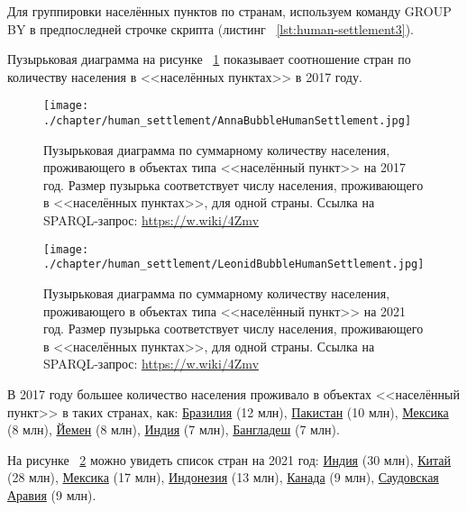 Для группировки населённых пунктов по странам, используем команду GROUP BY в предпоследней строчке скрипта (листинг ~\protect\ref{lst:human-settlement3}).

Пузырьковая диаграмма на рисунке ~\ref{fig:human-settlement-1} показывает соотношение стран по количеству населения в <<населённых пунктах>> в 2017 году.

\begin{figure}
\centering
	\texttt{[image: ./chapter/human\_settlement/AnnaBubbleHumanSettlement.jpg]}
	\label{fig:human-settlement-1}
    \caption[Пузырьковая диаграмма  по суммарному количеству населения в населённых пунктах, 2017.]{Пузырьковая диаграмма  по суммарному количеству населения, проживающего в объектах типа <<населённый пункт>> на 2017 год. Размер пузырька соответствует числу населения, проживающего в <<населённых пунктах>>, для одной страны. Ссылка на SPARQL-запрос: \href{https://w.wiki/4Zmv}{https://w.wiki/4Zmv}}
\end{figure}

\begin{figure}
\centering
	\texttt{[image: ./chapter/human\_settlement/LeonidBubbleHumanSettlement.jpg]}
	\label{fig:human-settlement-2}
	\caption[Пузырьковая диаграмма  по суммарному количеству населения в населённых пунктах, 2021.]{Пузырьковая диаграмма  по суммарному количеству населения, проживающего в объектах типа <<населённый пункт>> на 2021 год. Размер пузырька соответствует числу населения, проживающего в <<населённых пунктах>>, для одной страны. Ссылка на SPARQL-запрос: \href{https://w.wiki/4Zmv}{https://w.wiki/4Zmv}}
\end{figure}

В 2017 году большее количество населения проживало в объектах <<населённый пункт>> в таких странах, как: \href{http://www.wikidata.org/entity/Q155}{Бразилия} (\num{12} млн), \href{http://www.wikidata.org/entity/Q843}{Пакистан} (\num{10} млн), \href{http://www.wikidata.org/entity/Q96}{Мексика} (\num{8} млн), \href{http://www.wikidata.org/entity/Q805}{Йемен} (\num{8} млн), \href{http://www.wikidata.org/entity/Q668}{Индия} (\num{7} млн), \href{http://www.wikidata.org/entity/Q902}{Бангладеш} (\num{7} млн). 

На рисунке ~\ref{fig:human-settlement-2} можно увидеть список стран на 2021 год: \href{http://www.wikidata.org/entity/Q668}{Индия} (\num{30} млн), \href{http://www.wikidata.org/entity/Q148}{Китай} (\num{28} млн), \href{http://www.wikidata.org/entity/Q96}{Мексика} (\num{17} млн), \href{http://www.wikidata.org/entity/Q252}{Индонезия} (\num{13} млн), \href{http://www.wikidata.org/entity/Q16}{Канада} (\num{9} млн), \href{http://www.wikidata.org/entity/Q851}{Саудовская Аравия} (\num{9} млн). 

